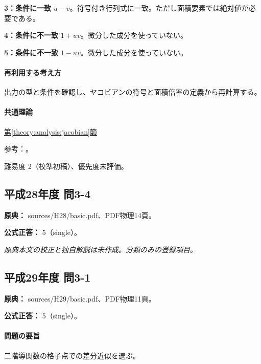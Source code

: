 \noindent\textbf{3：条件に一致} \(u-v\)。符号付き行列式に一致。ただし面積要素では絶対値が必要である。\par

\noindent\textbf{4：条件に不一致} \(1+uv\)。微分した成分を使っていない。\par

\noindent\textbf{5：条件に不一致} \(1-uv\)。微分した成分を使っていない。\par

\paragraph{再利用する考え方} 出力の型と条件を確認し、ヤコビアンの符号と面積倍率の定義から再計算する。

\paragraph{共通理論} \hyperref[theory:analysis:jacobian]{第\ref*{theory:analysis:jacobian}節}

\par 参考：\cite{mit_jacobian2007}。

\par 難易度 2（校準初稿）、優先度未評価。

\subsection{平成28年度 問3-4}
\label{q:h28-reg-basic-3-4}

\noindent\textbf{原典：} sources/H28/basic.pdf、PDF物理14頁。

\textbf{公式正答：} 5（single）。

\par\textit{原典本文の校正と独自解説は未作成。分類のみの登録項目。}

\subsection{平成29年度 問3-1}
\label{q:h29-reg-basic-3-1}

\noindent\textbf{原典：} sources/H29/basic.pdf、PDF物理11頁。

\textbf{公式正答：} 5（single）。

\paragraph{問題の要旨} 二階導関数の格子点での差分近似を選ぶ。


